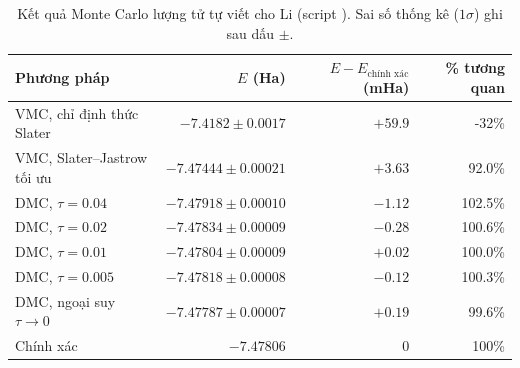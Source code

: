 \begin{table}[h]
\centering\small
\caption{Kết quả Monte Carlo lượng tử tự viết cho Li (script ). Sai số thống kê ($1\sigma$) ghi sau dấu $\pm$.}
\label{tab:qmc}
\begin{tabular}{@{}lrrr@{}}
\toprule
Phương pháp & $E$ (Ha) & $E-E_{\text{chính xác}}$ (mHa) & \% tương quan \\
\midrule
VMC, chỉ định thức Slater & $-7.4182\pm0.0017$ & $+59.9$ & -32\% \\
VMC, Slater--Jastrow tối ưu & $-7.47444\pm0.00021$ & $+3.63$ & 92.0\% \\
DMC, $\tau=0.04$ & $-7.47918\pm0.00010$ & $-1.12$ & 102.5\% \\
DMC, $\tau=0.02$ & $-7.47834\pm0.00009$ & $-0.28$ & 100.6\% \\
DMC, $\tau=0.01$ & $-7.47804\pm0.00009$ & $+0.02$ & 100.0\% \\
DMC, $\tau=0.005$ & $-7.47818\pm0.00008$ & $-0.12$ & 100.3\% \\
DMC, ngoại suy $\tau\to0$ & $-7.47787\pm0.00007$ & $+0.19$ & 99.6\% \\
\midrule
Chính xác & $-7.47806$ & 0 & 100\% \\
\bottomrule
\end{tabular}
\end{table}
